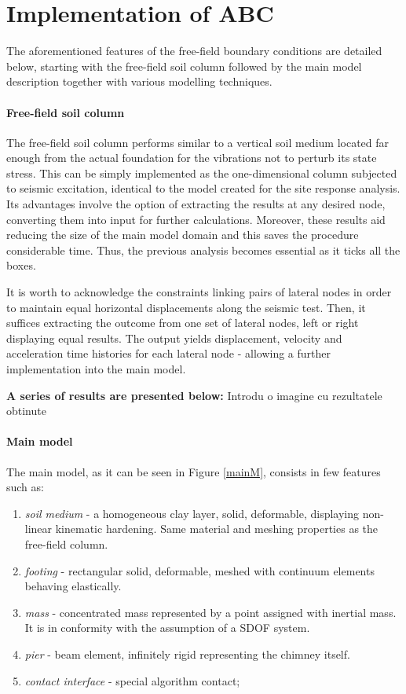 \section{Implementation of ABC} \label{implemenent}
The aforementioned features of the free-field boundary conditions are detailed below, starting with the free-field soil column followed by the main model description together with various modelling techniques. 
	\paragraph{Free-field soil column}
	The free-field soil column performs similar to a vertical soil medium located far enough from the actual foundation for the vibrations not to perturb its state stress. This can be simply implemented as the one-dimensional column subjected to seismic excitation, identical to the model created for the site response analysis. Its advantages involve the option of extracting the results at any desired node, converting them into input for further calculations. Moreover, these results aid reducing the size of the main model domain and this saves the procedure considerable time. Thus, the previous analysis becomes essential as it ticks all the boxes. 
	
	It is worth to acknowledge the constraints linking pairs of lateral nodes in order to maintain equal horizontal displacements along the seismic test. Then, it suffices extracting the outcome from one set of lateral nodes, left or right displaying equal results. The output yields displacement, velocity and acceleration time histories for each lateral node - allowing a further implementation into the main model.
	
	\textbf{A series of results are presented below:}
	 Introdu o imagine cu rezultatele obtinute
	\paragraph{Main model}
	The main model, as it can be seen in Figure \ref{mainM}, consists in few features such as:
	\begin{enumerate}
		\item \textit{soil medium} - a homogeneous clay layer, solid, deformable, displaying non-linear kinematic hardening. Same material and meshing properties as the free-field column.
		\item \textit{footing} -  rectangular solid, deformable, meshed with continuum elements behaving elastically.
		\item \textit{mass} - concentrated mass represented by a point assigned with inertial mass. It is in conformity with the assumption of a SDOF system.
		\item \textit{pier} - beam element, infinitely rigid representing the chimney itself.
		\item \textit{contact interface} - special algorithm contact;
	\end{enumerate}
	
